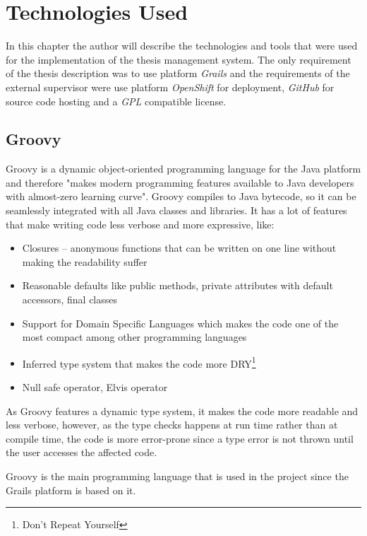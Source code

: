 \chapter{Technologies Used}

In this chapter the author will describe the technologies and tools that were used for the implementation of the thesis management system. The only requirement of the thesis description was to use platform \emph{Grails} and the requirements of the external supervisor were use platform \emph{OpenShift} for deployment, \emph{GitHub} for source code hosting and a \emph{GPL} compatible license.

\section{Groovy}

Groovy is a dynamic object-oriented programming language for the Java platform and therefore "makes modern programming features available to Java developers with almost-zero learning curve"\cite{groovy-homepage}. Groovy compiles to Java bytecode, so it can be seamlessly integrated with all Java classes and libraries\cite{groovy-homepage}. It has a lot of features that make writing code less verbose and more expressive, like:

\begin{itemize}
    \item Closures -- anonymous functions that can be written on one line without making the readability suffer
    \item Reasonable defaults like public methods, private attributes with default accessors, final classes
    \item Support for Domain Specific Languages which makes the code one of the most compact among other programming languages
    \item Inferred type system that makes the code more DRY\footnote{Don't Repeat Yourself}
    \item Null safe operator, Elvis operator
\end{itemize}

As Groovy features a dynamic type system, it makes the code more readable and less verbose, however, as the type checks happens at run time rather than at compile time, the code is more error-prone since a type error is not thrown until the user accesses the affected code.

Groovy is the main programming language that is used in the project since the Grails platform is based on it.

